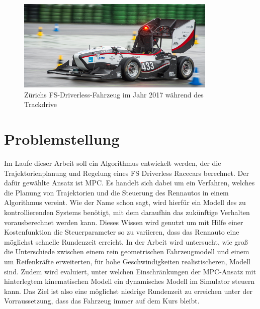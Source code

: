 \documentclass{like}
\begin{document}
\begin{figure}[hb!]
	\centering
	\includegraphics[width=270pt]{Abbildungen/amz-driverless-long.jpg}
	\caption{Zürichs \ac{FS}-Driverless-Fahrzeug im Jahr 2017 während des Trackdrive}
\end{figure}

\section{Problemstellung}
Im Laufe dieser Arbeit soll ein Algorithmus entwickelt werden, der die Trajektorienplanung und Regelung eines \ac{FS} Driverless Racecars berechnet. Der dafür gewählte Ansatz ist \ac{MPC}. Es handelt sich dabei um ein Verfahren, welches die Planung von Trajektorien und die Steuerung des Rennautos in einem Algorithmus vereint. Wie der Name schon sagt, wird hierfür ein Modell des zu kontrollierenden Systems benötigt, mit dem daraufhin das zukünftige Verhalten vorausberechnet werden kann. Dieses Wissen wird genutzt um mit Hilfe einer Kostenfunktion die Steuerparameter so zu variieren, dass das Rennauto eine möglichst schnelle Rundenzeit erreicht. In der Arbeit wird untersucht, wie groß die Unterschiede zwischen einem rein geometrischen Fahrzeugmodell und einem um Reifenkräfte erweiterten, für hohe Geschwindigkeiten realistischeren, Modell sind. Zudem wird evaluiert, unter welchen Einschränkungen der \ac{MPC}-Ansatz mit hinterlegtem kinematischen Modell ein dynamisches Modell im Simulator steuern kann. Das Ziel ist also eine möglichst niedrige Rundenzeit zu erreichen unter der Vorraussetzung, dass das Fahrzeug immer auf dem Kurs bleibt.
\end{document}
